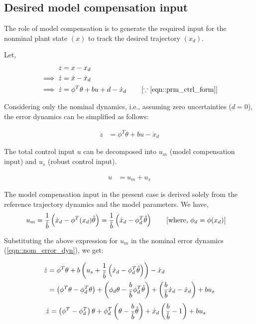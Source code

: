 \subsection{Desired model compensation input}
The role of model compensation is to generate the required input for the
nonminal plant state $(x)$ to track the desired trajectory $(x_d)$.

Let,
\begin{align}
    z &= x - x_d\\
    \implies \dot z &= \dot x - \dot x_d\\
    \implies \dot z &= \phi^T \theta +  bu + d - \dot x_d \qquad \left[ \because \ref{eqn::prm_ctrl_form} \right]
    \label{eqn::error_dyn}
\end{align}

Considering only the nominal dynamics, i.e., assuming zero uncertainties ($d = 0$), the error dynamics can be simplified as follows:

\begin{align}
    \dot z &= \phi^T \theta + bu - \dot x_d
    \label{eqn::nom_error_dyn}
\end{align}

The total control input $u$ can be decomposed into $u_m$ (model compensation input) and $u_s$ (robust control input).

\begin{align}
    u &= u_m + u_s
\end{align}

The model compensation input in the present case is derived solely from the
reference trajectory dynamics and the model parameters. We have,
\begin{align}
    u_m &= \frac{1}{\hat b} \left( \dot x_d - \phi^T(x_d) \hat \theta \right)
         = \frac{1}{\hat b} \left( \dot x_d - \phi^T_d \hat \theta \right)
         \qquad \left[ \text{where, } \phi_d  = \phi(x_d) \right]
\end{align}

Substituting the above expression for $u_m$ in the nominal error dynamics (\ref{eqn::nom_error_dyn}), we get:

\begin{align*}
    \dot z &= \phi^T \theta + b \left( u_s + \frac{1}{\hat b} \left( \dot x_d - \phi^T_d \hat \theta \right) \right) - \dot x_d \\
    &= \left( \phi^T \theta - \phi_d^T \theta \right) + \left( \phi_d \theta - \frac{b}{\hat b} \phi_d^T \hat \theta \right) + \left( \frac{b}{\hat b} \dot x_d - \dot x_d \right) + b u_s\\
\end{align*}
\begin{align}
    \dot z &= \left( \phi^T - \phi_d^T \right) \theta + \phi_d^T \left(  \theta - \frac{b}{\hat b} \hat \theta \right) + \dot x_d \left( \frac{b}{\hat b} - 1 \right) + b u_s
    \label{eqn::error_dyn_model_comp}
\end{align}

